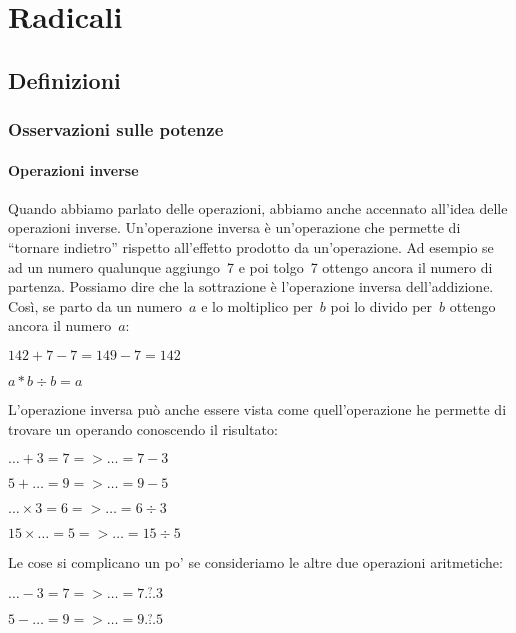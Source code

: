
\chapter{Radicali}

\section{Definizioni}
\label{sec:radici_definizioni}

\subsection{Osservazioni sulle potenze}

\subsubsection{Operazioni inverse}

Quando abbiamo parlato delle operazioni, abbiamo anche accennato all'idea
delle operazioni inverse. Un'operazione inversa è un'operazione che permette
di ``tornare indietro'' rispetto all'effetto prodotto da un'operazione.
Ad esempio se ad un numero qualunque aggiungo~7 e poi tolgo~7 ottengo ancora il 
numero di partenza. Possiamo dire che la sottrazione è l'operazione inversa 
dell'addizione. Così, se parto da un numero~\(a\) e lo moltiplico per~\(b\) poi lo 
divido per~\(b\) ottengo ancora il numero~\(a\):

\(142 + 7 - 7 = 149 -7 = 142\)

\(a * b \div b= a\)

L'operazione inversa può anche essere vista come quell'operazione he permette 
di trovare un operando conoscendo il risultato:

\(\dots + 3 = 7 => \dots = 7 - 3\)

\(5 + \dots = 9 => \dots = 9 - 5\)

\(\dots \times 3 = 6 => \dots = 6 \div 3\)

\(15 \times \dots = 5 => \dots = 15 \div 5\)

Le cose si complicano un po' se consideriamo le altre due operazioni 
aritmetiche:

\(\dots - 3 = 7 => \dots = 7 \overset{?}{\dots} 3\)

\(5 - \dots = 9 => \dots = 9 \overset{?}{\dots} 5\)

